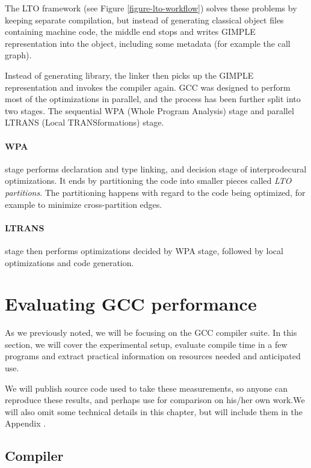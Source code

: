 The LTO framework (see Figure \ref{figure-lto-workflow}) solves these problems by keeping separate compilation, but
instead of generating classical object files containing machine code, the
middle end stops and writes GIMPLE representation into the object, including
some metadata (for example the call graph).

Instead of generating library, the linker then picks up the GIMPLE
representation and invokes the compiler again. GCC was designed to perform most
of the optimizations in parallel, and the process has been further split into
two stages. The sequential WPA (Whole Program Analysis) stage and parallel
LTRANS (Local TRANSformations) stage.

\paragraph{WPA} stage performs declaration and type linking, and decision stage
of interprodecural optimizations. It ends by partitioning the code into smaller
pieces called {\sl LTO partitions}. The partitioning happens with regard to the
code being optimized, for example to minimize cross-partition edges.

\paragraph{LTRANS} stage then performs optimizations decided by WPA stage,
followed by local optimizations and code generation.


\section{Evaluating GCC performance}

As we previously noted, we will be focusing on the GCC compiler suite. In this
section, we will cover the experimental setup, evaluate compile time in a few
programs and extract practical information on resources needed and
anticipated use.

We will publish source code used to take these measurements, so anyone can
reproduce these results, and perhaps use for comparison on his/her own work.We 
will also omit some technical details in this chapter, but will include them in
the Appendix .

\subsection{Compiler}

